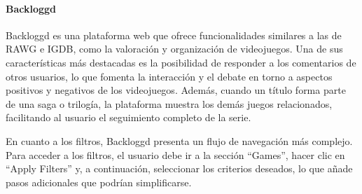 \paragraph{Backloggd}
Backloggd es una plataforma web que ofrece funcionalidades similares a las de RAWG e IGDB, como la valoración y organización de videojuegos. 
Una de sus características más destacadas es la posibilidad de responder a los comentarios de otros usuarios, lo que fomenta la interacción 
y el debate en torno a aspectos positivos y negativos de los videojuegos. Además, cuando un título forma parte de una saga o trilogía, la 
plataforma muestra los demás juegos relacionados, facilitando al usuario el seguimiento completo de la serie.

En cuanto a los filtros, Backloggd presenta un flujo de navegación más complejo. Para acceder a los filtros, el usuario debe ir 
a la sección “Games”, hacer clic en “Apply Filters” y, a continuación, seleccionar los criterios deseados, lo que añade pasos adicionales
que podrían simplificarse.

